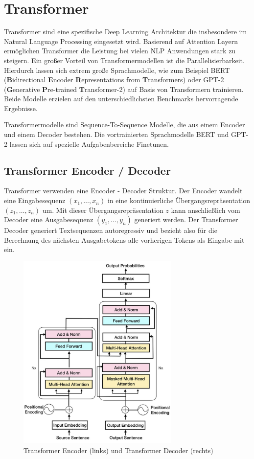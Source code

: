 \section{Transformer}\raggedbottom \label{transformer}
Transformer sind eine spezifische Deep Learning Architektur die insbesondere im Natural Language Processing eingesetzt wird. 
Basierend auf Attention Layern ermöglichen Transformer die Leistung bei vielen NLP Anwendungen stark zu steigern. 
Ein großer Vorteil von Transformermodellen ist die Parallelisierbarkeit. 
Hierdurch lassen sich extrem große Sprachmodelle, wie zum Beispiel BERT (\textbf{B}idirectional \textbf{E}ncoder \textbf{R}epresentations from \textbf{T}ransformers) oder GPT-2 (\textbf{G}enerative \textbf{P}re-trained \textbf{T}ransformer-2) auf Basis von Transformern trainieren. 
Beide Modelle erzielen auf den unterschiedlichsten Benchmarks hervorragende Ergebnisse.

Transformermodelle sind Sequence-To-Sequence Modelle, die aus einem Encoder und einem Decoder bestehen.
Die vortrainierten Sprachmodelle BERT und GPT-2 lassen sich auf spezielle Aufgabenbereiche Finetunen.


\subsection{Transformer Encoder / Decoder}
Transformer verwenden eine Encoder - Decoder Struktur. Der Encoder wandelt eine Eingabesequenz $(x_1,\ldots,x_n)$ in eine kontinuierliche Übergangsrepräsentation $(z_1, \ldots, z_n)$ um. 
Mit dieser Übergangsrepräsentation $z$ kann anschließlich vom Decoder eine Ausgabesequenz $(y_1, \ldots, y_n)$ generiert werden.
Der Transformer Decoder generiert Textsequenzen autoregressiv und bezieht also für die Berechnung des nächsten Ausgabetokens alle vorherigen Tokens als Eingabe mit ein.


\begin{figure}[h]
    \label{transformerfig}
    \centering
    \includegraphics[width=8cm]{bilder/Transformer-Encoder-Decoder}
    \caption{Transformer Encoder (links) und Transformer Decoder (rechts)}
\end{figure}



